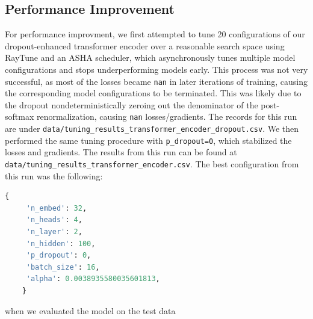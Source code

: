 \documentclass[10pt]{article}
\newcommand{\code}[1]{\texttt{#1}}
\theoremstyle{definition}
\begin{document}
\subsection{Performance Improvement}
\noindent For performance improvment, we first attempted to tune 20 configurations of our dropout-enhanced transformer encoder over a reasonable search space using RayTune and an ASHA scheduler, which asynchronously tunes multiple model configurations and stops underperforming models early. This process was not very successful, as most of the losses became \code{nan} in later iterations of training, causing the corresponding model configurations to be terminated. This was likely due to the dropout nondeterministically zeroing out the denominator of the post-softmax renormalization, causing \code{nan} losses/gradients. The records for this run are under \code{data/tuning\_results\_transformer\_encoder\_dropout.csv}. We then performed the same tuning procedure with \code{p\_dropout=0}, which stabilized the losses and gradients. The results from this run can be found at \code{data/tuning\_results\_transformer\_encoder.csv}. The best configuration from this run was the following:
\newpage
\begin{lstlisting}[language=Python, basicstyle=\ttfamily\small, frame=single] 
    {
     'n_embed': 32,
     'n_heads': 4,
     'n_layer': 2,
     'n_hidden': 100,
     'p_dropout': 0,
     'batch_size': 16,
     'alpha': 0.0038935580035601813, 
    } 
\end{lstlisting}
when we evaluated the model on the test data



\end{document}
